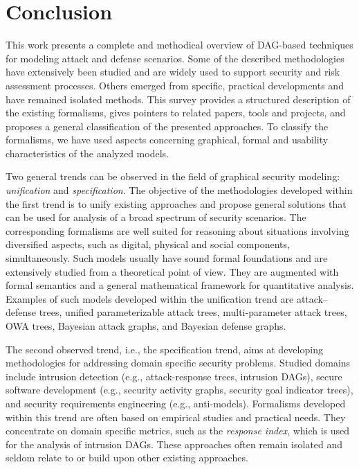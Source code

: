 \documentclass[a4paper]{article}
\begin{document}
\section{Conclusion} \label{sec:conclusion}

This work presents a complete and methodical overview of DAG-based techniques
for modeling attack and defense scenarios. Some of the described methodologies
have extensively been studied and are widely used to support security and risk
assessment processes. Others emerged from specific, practical developments and 
have remained isolated methods. This survey provides a structured description of
the existing formalisms, gives pointers to related papers, tools and projects,
and proposes a general classification of the presented approaches. To classify
the formalisms, we have used  aspects concerning graphical, formal and
usability characteristics of the analyzed models.

Two general trends can be observed in the field of graphical security modeling:
\emph{unification} and \emph{specification}. The objective of the methodologies
developed within the first trend is to unify existing approaches and propose
general solutions that can be used for analysis of a broad spectrum of security 
scenarios. The corresponding formalisms are well suited for reasoning about
situations involving diversified aspects, such as digital, physical and social
components, simultaneously. Such models usually have sound formal foundations
and are extensively studied from a theoretical point of view. They are augmented
with formal semantics and a general mathematical framework for quantitative
analysis. Examples of such models developed within the unification trend are
attack--defense trees, unified parameterizable attack trees, multi-parameter
attack trees, OWA trees, Bayesian attack graphs, and Bayesian defense graphs.

The second observed trend, i.e., the specification trend, aims at developing 
methodologies for addressing domain specific security problems. Studied domains
include intrusion detection (e.g., attack-response trees, intrusion DAGs),
secure software development (e.g., security activity graphs, security goal
indicator trees), and security requirements engineering (e.g., anti-models).
Formalisms developed within this trend are often based on empirical studies and
practical needs. They concentrate on domain specific  metrics, such as the
\emph{response index}, which is used for the analysis of intrusion DAGs. These
approaches often remain isolated and seldom relate to or build upon other
existing approaches.
\end{document}
